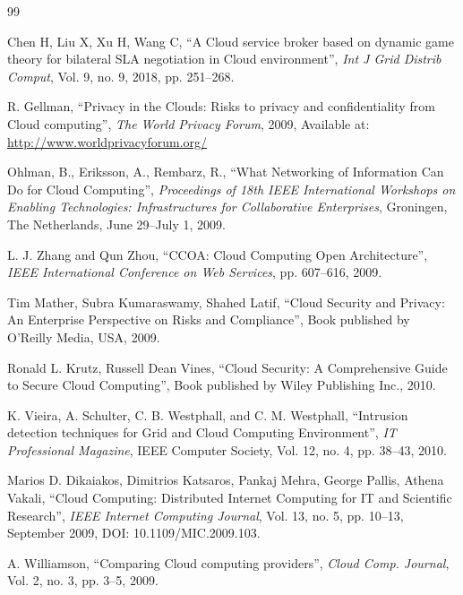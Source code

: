 \begin{thebibliography}{99}

 Chen H, Liu X, Xu H, Wang C, ``A Cloud service broker based on dynamic game theory for bilateral SLA negotiation in Cloud environment'', \textit{Int J Grid Distrib Comput}, Vol. 9, no. 9, 2018, pp. 251--268.

 R. Gellman, ``Privacy in the Clouds: Risks to privacy and confidentiality from Cloud computing'', \textit{The World Privacy Forum}, 2009, Available at: \url{http://www.worldprivacyforum.org/}

 Ohlman, B., Eriksson, A., Rembarz, R., ``What Networking of Information Can Do for Cloud Computing'', \textit{Proceedings of 18th IEEE International Workshops on Enabling Technologies: Infrastructures for Collaborative Enterprises}, Groningen, The Netherlands, June 29--July 1, 2009.

 L. J. Zhang and Qun Zhou, ``CCOA: Cloud Computing Open Architecture'', \textit{IEEE International Conference on Web Services}, pp. 607--616, 2009.

 Tim Mather, Subra Kumaraswamy, Shahed Latif, ``Cloud Security and Privacy: An Enterprise Perspective on Risks and Compliance'', Book published by O'Reilly Media, USA, 2009.

 Ronald L. Krutz, Russell Dean Vines, ``Cloud Security: A Comprehensive Guide to Secure Cloud Computing'', Book published by Wiley Publishing Inc., 2010.

 K. Vieira, A. Schulter, C. B. Westphall, and C. M. Westphall, ``Intrusion detection techniques for Grid and Cloud Computing Environment'', \textit{IT Professional Magazine}, IEEE Computer Society, Vol. 12, no. 4, pp. 38--43, 2010.

 Marios D. Dikaiakos, Dimitrios Katsaros, Pankaj Mehra, George Pallis, Athena Vakali, ``Cloud Computing: Distributed Internet Computing for IT and Scientific Research'', \textit{IEEE Internet Computing Journal}, Vol. 13, no. 5, pp. 10--13, September 2009, DOI: 10.1109/MIC.2009.103.

 A. Williamson, ``Comparing Cloud computing providers'', \textit{Cloud Comp. Journal}, Vol. 2, no. 3, pp. 3--5, 2009.

\end{thebibliography}
